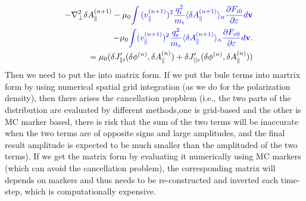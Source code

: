 \documentclass{article}
\newcommand{\tmcolor}[2]{{\color{#1}{#2}}}
\begin{document}
\begin{eqnarray}
  &  & - \nabla^2_{\perp} \delta A_{\parallel}^{(n + 1)} - \mu_0
  \tmcolor{blue}{\int {(v_{\parallel}^{(n + 1)})^2}  \frac{q^2_i}{m_i} \langle
  \delta A_{\parallel}^{(n + 1)} \rangle_{\alpha} \frac{\partial F_{i
  0}}{\partial \varepsilon} d\mathbf{v}} \nonumber\\
  &  & - \mu_0 \tmcolor{blue}{\int (v_{\parallel}^{(n + 1)})^2
  \frac{q^2_e}{m_e} \langle \delta A_{\parallel}^{(n + 1)} \rangle_{\alpha}
  \frac{\partial F_{e 0}}{\partial \varepsilon} d\mathbf{v}} . \nonumber\\
  &  & = \mu_0  (\delta J_{\parallel i}' (\delta \phi^{(n)}, \delta
  A_{\parallel}^{(n)}) + \delta J'_{||e} (\delta \phi^{(n)}, \delta
  A_{\parallel}^{(n)})) 
\end{eqnarray}
Then we need to put the \tmcolor{blue}{blue terms} into matrix form. If we put
the bule terms into martrix form by using numerical spatial grid integration
(as we do for the polarization density), then there arises the cancellation
propblem (i.e., the two parts of the distribution are evaluated by different
methods,one is grid-based and the other is MC marker based, there is risk that
the sum of the two terms will be inaccurate when the two terms are of opposite
signs and large amplitudes, and the final result amplitude is expected to be
much smaller than the amplituded of the two terms). If we get the matrix form
by evaluating it numerically using MC markers (which can avoid the
cancellation problem), the corresponding matrix will depends on markers and
thus needs to be re-constructed and inverted each time-step, which is
computationally expensive.
\end{document}

